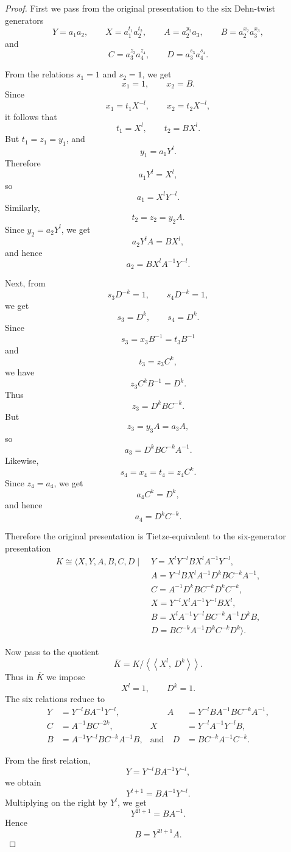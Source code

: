 \documentclass{article}
\begin{document}
\begin{proof}

First we pass from the original presentation to the six Dehn-twist generators
\[
Y=a_1a_2,\qquad
X=a_1^{t_1}a_2^{t_2},\qquad
A=a_2^{y_2}a_3,\qquad
B=a_2^{x_2}a_3^{x_3},
\]
and
\[
C=a_3^{z_3}a_4^{z_4},
\qquad
D=a_3^{s_3}a_4^{s_4}.
\]

From the relations \(s_1=1\) and \(s_2=1\), we get
\[
x_1=1,\qquad x_2=B.
\]
Since
\[
x_1=t_1X^{-l},\qquad x_2=t_2X^{-l},
\]
it follows that
\[
t_1=X^l,\qquad t_2=BX^l.
\]
But \(t_1=z_1=y_1\), and
\[
y_1=a_1Y^l.
\]
Therefore
\[
a_1Y^l=X^l,
\]
so
\[
a_1=X^lY^{-l}.
\]
Similarly,
\[
t_2=z_2=y_2A.
\]
Since \(y_2=a_2Y^l\), we get
\[
a_2Y^lA=BX^l,
\]
and hence
\[
a_2=BX^lA^{-1}Y^{-l}.
\]

Next, from
\[
s_3D^{-k}=1,\qquad s_4D^{-k}=1,
\]
we get
\[
s_3=D^k,\qquad s_4=D^k.
\]
Since
\[
s_3=x_3B^{-1}=t_3B^{-1}
\]
and
\[
t_3=z_3C^k,
\]
we have
\[
z_3C^kB^{-1}=D^k.
\]
Thus
\[
z_3=D^kBC^{-k}.
\]
But
\[
z_3=y_3A=a_3A,
\]
so
\[
a_3=D^kBC^{-k}A^{-1}.
\]
Likewise,
\[
s_4=x_4=t_4=z_4C^k.
\]
Since \(z_4=a_4\), we get
\[
a_4C^k=D^k,
\]
and hence
\[
a_4=D^kC^{-k}.
\]

Therefore the original presentation is Tietze-equivalent to the
six-generator presentation
\[
\begin{aligned}
K\cong
\langle X,Y,A,B,C,D \mid\;&
Y=X^lY^{-l}BX^lA^{-1}Y^{-l},\\
&
A=Y^{-l}BX^lA^{-1}D^kBC^{-k}A^{-1},\\
&
C=A^{-1}D^kBC^{-k}D^kC^{-k},\\
&
X=Y^{-l}X^lA^{-1}Y^{-l}BX^l,\\
&
B=X^lA^{-1}Y^{-l}BC^{-k}A^{-1}D^kB,\\
&
D=BC^{-k}A^{-1}D^kC^{-k}D^k
\rangle .
\end{aligned}
\]

Now pass to the quotient
\[
\overline K
=
K/\left\langle\!\left\langle X^l,\ D^k\right\rangle\!\right\rangle .
\]
Thus in \(\overline K\) we impose
\[
X^l=1,\qquad D^k=1.
\]
The six relations reduce to
\[
\begin{aligned}
Y&=Y^{-l}BA^{-1}Y^{-l},&\qquad
A&=Y^{-l}BA^{-1}BC^{-k}A^{-1},\\
C&=A^{-1}BC^{-2k},&
X&=Y^{-l}A^{-1}Y^{-l}B,\\
B&=A^{-1}Y^{-l}BC^{-k}A^{-1}B,&
\text{and}\quad D&=BC^{-k}A^{-1}C^{-k}.
\end{aligned}
\]

From the first relation,
\[
Y=Y^{-l}BA^{-1}Y^{-l},
\]
we obtain
\[
Y^{l+1}=BA^{-1}Y^{-l}.
\]
Multiplying on the right by \(Y^l\), we get
\[
Y^{2l+1}=BA^{-1}.
\]
Hence
\[
B=Y^{2l+1}A.
\]


\end{proof}
\end{document}
